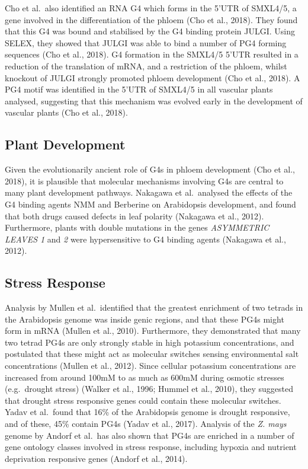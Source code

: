 \documentclass[12pt,a4paper,]{report}
\begin{document}
Cho et al.~also identified an RNA G4 which forms in the 5'UTR of
SMXL4/5, a gene involved in the differentiation of the phloem (Cho et
al., 2018). They found that this G4 was bound and stabilised by the G4
binding protein JULGI. Using SELEX, they showed that JULGI was able to
bind a number of PG4 forming sequences (Cho et al., 2018). G4 formation
in the SMXL4/5 5'UTR resulted in a reduction of the translation of mRNA,
and a restriction of the phloem, whilst knockout of JULGI strongly
promoted phloem development (Cho et al., 2018). A PG4 motif was
identified in the 5'UTR of SMXL4/5 in all vascular plants analysed,
suggesting that this mechanism was evolved early in the development of
vascular plants (Cho et al., 2018).

\hypertarget{plant-development}{%
\subsection{Plant Development}\label{plant-development}}

\label{ssec:plant_dev}

Given the evolutionarily ancient role of G4s in phloem development (Cho
et al., 2018), it is plausible that molecular mechanisms involving G4s
are central to many plant development pathways. Nakagawa et al.~analysed
the effects of the G4 binding agents NMM and Berberine on Arabidopsis
development, and found that both drugs caused defects in leaf polarity
(Nakagawa et al., 2012). Furthermore, plants with double mutations in
the genes \emph{ASYMMETRIC LEAVES 1} and \emph{2} were hypersensitive to
G4 binding agents (Nakagawa et al., 2012).

\hypertarget{stress-response}{%
\subsection{Stress Response}\label{stress-response}}

\label{ssec:plant_stress}

Analysis by Mullen et al.~identified that the greatest enrichment of two
tetrads in the Arabidopsis genome was inside genic regions, and that
these PG4s might form in mRNA (Mullen et al., 2010). Furthermore, they
demonstrated that many two tetrad PG4s are only strongly stable in high
potassium concentrations, and postulated that these might act as
molecular switches sensing environmental salt concentrations (Mullen et
al., 2012). Since cellular potassium concentrations are increased from
around 100mM to as much as 600mM during osmotic stresses (e.g.~drought
stress) (Walker et al., 1996; Hummel et al., 2010), they suggested that
drought stress responsive genes could contain these molecular switches.
Yadav et al.~found that 16\% of the Arabidopsis genome is drought
responsive, and of these, 45\% contain PG4s (Yadav et al., 2017).
Analysis of the \emph{Z. mays} genome by Andorf et al.~has also shown
that PG4s are enriched in a number of gene ontology classes involved in
stress response, including hypoxia and nutrient deprivation responsive
genes (Andorf et al., 2014).
\end{document}
